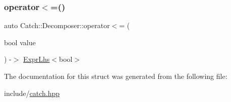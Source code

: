 \mbox{\label{struct_catch_1_1_decomposer_aac129b94903ae1339d5709049d83613b}} 
\subsubsection{\texorpdfstring{operator$<$=()}{operator<=()}\hspace{0.1cm}{\footnotesize\ttfamily [2/2]}}
{\footnotesize\ttfamily auto Catch\+::\+Decomposer\+::operator$<$= (\begin{DoxyParamCaption}\item[{bool}]{value }\end{DoxyParamCaption}) -\/$>$ \mbox{\hyperlink{class_catch_1_1_expr_lhs}{Expr\+Lhs}}$<$bool$>$ \hspace{0.3cm}{\ttfamily [inline]}}



The documentation for this struct was generated from the following file\+:\begin{DoxyCompactItemize}
\item 
include/\mbox{\hyperlink{catch_8hpp}{catch.\+hpp}}\end{DoxyCompactItemize}
